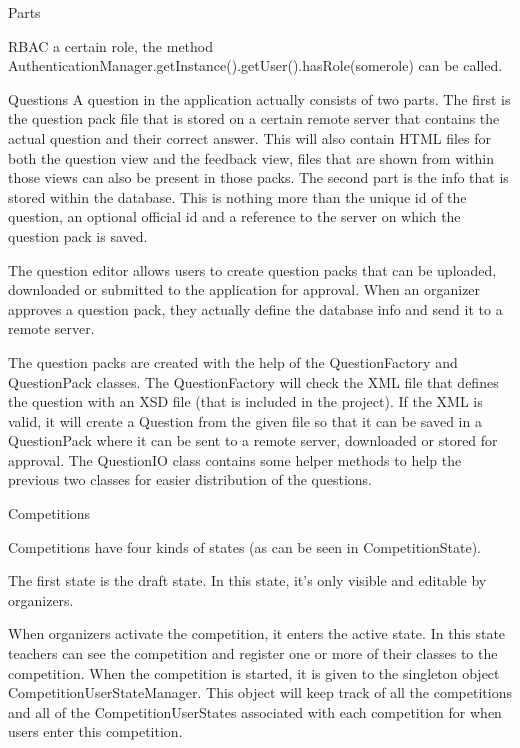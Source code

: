 \documentclass[]{article}
\begin{document}
\begin{section}{Parts}
\begin{subsection}{RBAC}
        a certain role, the method AuthenticationManager.getInstance().getUser().hasRole(somerole)
        can be called.
    \end{subsection}
    \begin{subsection}{Questions}
        A question in the application actually consists of two parts.
        The first is the question pack file that is stored on a certain remote server
        that contains the actual question and their correct answer. This will also contain
        HTML files for both the question view and the feedback view, files that are shown
        from within those views can also be present in those packs.
        The second part is the info that is stored within the database. This is nothing
        more than the unique id of the question, an optional official id and a reference
        to the server on which the question pack is saved.
        
        The question editor allows users to create question packs that can be uploaded, 
        downloaded or submitted to the application for approval. When an organizer approves
        a question pack, they actually define the database info and send it to a remote server.
        
        The question packs are created with the help of the QuestionFactory and
        QuestionPack classes. The QuestionFactory will check the XML file that defines
        the question with an XSD file (that is included in the project). If the XML is
        valid, it will create a Question from the given file so that it can be saved in
        a QuestionPack where it can be sent to a remote server, downloaded or stored
        for approval. The QuestionIO class contains some helper methods to help the
        previous two classes for easier distribution of the questions.
    \end{subsection}
    \begin{subsection}{Competitions}
    
        Competitions have four kinds of states (as can be seen in CompetitionState).
        
        The first state is the draft state. In this state, it's only visible and editable
        by organizers. 
        
        When organizers activate the competition, it enters the active state. In this state
        teachers can see the competition and register one or more of their classes to the
        competition. When the competition is started, it is given to the singleton object
        CompetitionUserStateManager. This object will keep track of all the competitions
        and all of the CompetitionUserStates associated with each competition for when
        users enter this competition.
        

\end{subsection}
\end{section}
\end{document}
